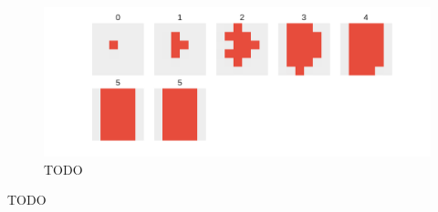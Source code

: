\begin{figure}
\centering
\includegraphics[width=\textwidth, keepaspectratio]{fig/result_figs/border_point_5}
\caption{
    TODO
}
\label{fig:border_point_5}
\end{figure}

TODO
